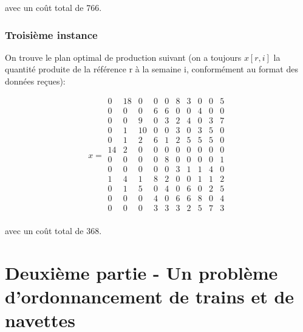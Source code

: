 \documentclass{rapport}
\begin{document}
avec un coût total de 766.

\subsubsection{Troisième instance}
On trouve le plan optimal de production suivant (on a toujours $x[r,i]$ la quantité produite de la référence r à la semaine i, conformément au format des données reçues):

\[x=
\begin{matrix}
0 & 18 & 0 & 0 & 0 & 8 & 3 & 0 & 0 & 5 \\
0 & 0 & 0 & 6 & 6 & 0 & 0 & 4 & 0 & 0 \\
0 & 0 & 9 & 0 & 3 & 2 & 4 & 0 & 3 & 7 \\
0 & 1 & 10 & 0 & 0 & 3 & 0 & 3 & 5 & 0 \\
0 & 1 & 2 & 6 & 1 & 2 & 5 & 5 & 5 & 0 \\
14 & 2 & 0 & 0 & 0 & 0 & 0 & 0 & 0 & 0 \\
0 & 0 & 0 & 0 & 8 & 0 & 0 & 0 & 0 & 1 \\
0 & 0 & 0 & 0 & 0 & 3 & 1 & 1 & 4 & 0 \\
1 & 4 & 1 & 8 & 2 & 0 & 0 & 1 & 1 & 2 \\
0 & 1 & 5 & 0 & 4 & 0 & 6 & 0 & 2 & 5 \\
0 & 0 & 0 & 4 & 0 & 6 & 6 & 8 & 0 & 4 \\
0 & 0 & 0 & 3 & 3 & 3 & 2 & 5 & 7 & 3 \\
\end{matrix}
\]

avec un coût total de 368.

\section{Deuxième partie - Un problème d'ordonnancement de trains et de navettes}
\end{document}
